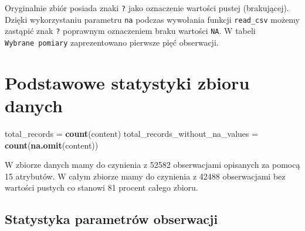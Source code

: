 \documentclass[]{article}
\newenvironment{Shaded}{\begin{snugshade}}{\end{snugshade}}
\newcommand{\DataTypeTok}[1]{\textcolor[rgb]{0.13,0.29,0.53}{#1}}
\newcommand{\KeywordTok}[1]{\textcolor[rgb]{0.13,0.29,0.53}{\textbf{#1}}}
\newcommand{\NormalTok}[1]{#1}
\newcommand{\OperatorTok}[1]{\textcolor[rgb]{0.81,0.36,0.00}{\textbf{#1}}}
\newcommand{\StringTok}[1]{\textcolor[rgb]{0.31,0.60,0.02}{#1}}
\begin{document}
Oryginalnie zbiór posiada znaki \texttt{?} jako oznaczenie wartości
pustej (brakującej). Dzięki wykorzystaniu parametru \texttt{na} podczas
wywołania funkcji \texttt{read\_csv} możemy zastąpić znak \texttt{?}
poprawnym oznaczeniem braku wartości \texttt{NA}. W tabeli
\texttt{Wybrane\ pomiary} zaprezentowano pierwsze pięć obserwacji.

\hypertarget{podstawowe-statystyki-zbioru-danych}{%
\section{Podstawowe statystyki zbioru
danych}\label{podstawowe-statystyki-zbioru-danych}}

\begin{Shaded}
\begin{Highlighting}[]
\NormalTok{total_records =}\StringTok{ }\KeywordTok{count}\NormalTok{(content)}
\NormalTok{total_records_without_na_values =}\StringTok{ }\KeywordTok{count}\NormalTok{(}\KeywordTok{na.omit}\NormalTok{(content))}
\end{Highlighting}
\end{Shaded}

W zbiorze danych mamy do czynienia z 52582 obserwacjami opisanych za
pomocą 15 atrybutów. W całym zbiorze mamy do czynienia z 42488
obserwacjami bez wartości pustych co stanowi 81 procent całego zbioru.

\hypertarget{statystyka-parametruxf3w-obserwacji}{%
\subsection{Statystyka parametrów
obserwacji}\label{statystyka-parametruxf3w-obserwacji}}

\begin{Shaded}
\end{Shaded}
\end{document}
